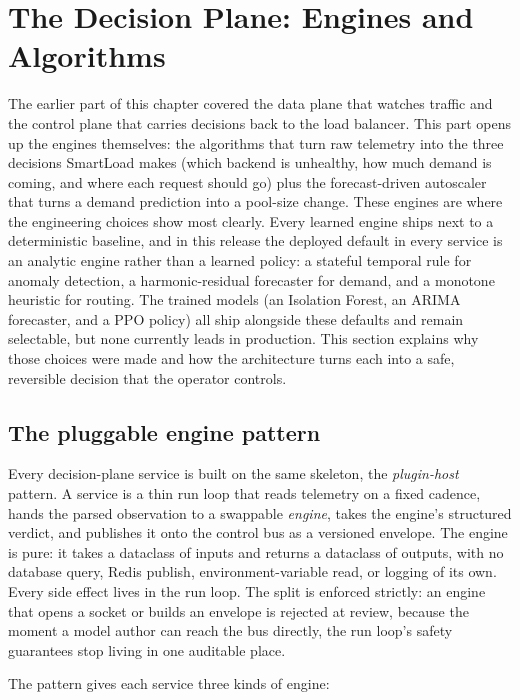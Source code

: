 \section{The Decision Plane: Engines and Algorithms}\label{ch:impl_decision}

The earlier part of this chapter covered the data plane that watches traffic and
the control plane that carries decisions back to the load balancer. This part
opens up the engines themselves: the algorithms that turn raw telemetry into the
three decisions SmartLoad makes (which backend is unhealthy, how much demand is
coming, and where each request should go) plus the forecast-driven autoscaler
that turns a demand prediction into a pool-size change. These engines are where
the engineering choices show most clearly. Every learned engine ships next to a
deterministic baseline, and in this release the deployed default in every service
is an analytic engine rather than a learned policy: a stateful temporal rule for
anomaly detection, a harmonic-residual forecaster for demand, and a monotone
heuristic for routing. The trained models (an Isolation Forest, an ARIMA
forecaster, and a PPO policy) all ship alongside these defaults and remain
selectable, but none currently leads in production. This section explains why
those choices were made and how the architecture turns each into a safe,
reversible decision that the operator controls.

\subsection{The pluggable engine pattern}\label{imb:pluggable}

Every decision-plane service is built on the same skeleton, the
\emph{plugin-host} pattern. A service is a thin run loop that reads telemetry on
a fixed cadence, hands the parsed observation to a swappable \emph{engine}, takes
the engine's structured verdict, and publishes it onto the control bus as a
versioned envelope. The engine is pure: it takes a dataclass of inputs and
returns a dataclass of outputs, with no database query, Redis publish,
environment-variable read, or logging of its own. Every side effect lives in the
run loop. The split is enforced strictly: an engine that opens a socket or builds
an envelope is rejected at review, because the moment a model author can reach the
bus directly, the run loop's safety guarantees stop living in one auditable place.

The pattern gives each service three kinds of engine:

